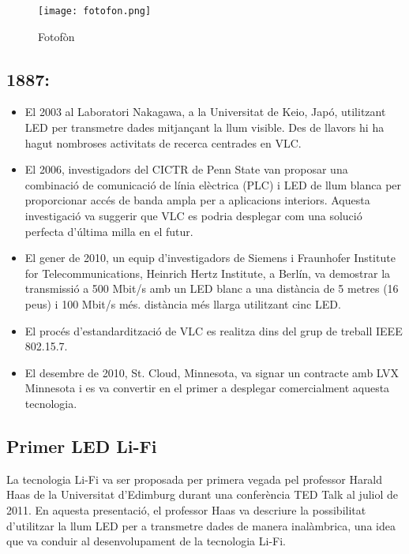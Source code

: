 \begin{figure}[h!]
    \centering
    \texttt{[image: fotofon.png]}
    \caption{Fotofòn}
\end{figure}


\subsection*{1887: }

\begin{itemize}
    \item El 2003 al Laboratori Nakagawa, a la Universitat de Keio, Japó, utilitzant LED per transmetre dades mitjançant la llum visible. Des de llavors hi ha hagut nombroses activitats de recerca centrades en VLC.
    \item El 2006, investigadors del CICTR de Penn State van proposar una combinació de comunicació de línia elèctrica (PLC) i LED de llum blanca per proporcionar accés de banda ampla per a aplicacions interiors. Aquesta investigació va suggerir que VLC es podria desplegar com una solució perfecta d'última milla en el futur.
    \item El gener de 2010, un equip d'investigadors de Siemens i Fraunhofer Institute for Telecommunications, Heinrich Hertz Institute, a Berlín, va demostrar la transmissió a 500 Mbit/s amb un LED blanc a una distància de 5 metres (16 peus) i 100 Mbit/s més. distància més llarga utilitzant cinc LED.
    \item El procés d'estandardització de VLC es realitza dins del grup de treball IEEE 802.15.7.
    \item El desembre de 2010, St. Cloud, Minnesota, va signar un contracte amb LVX Minnesota i es va convertir en el primer a desplegar comercialment aquesta tecnologia.

\end{itemize}


\subsection*{Primer LED Li-Fi}

La tecnologia Li-Fi va ser proposada per primera vegada pel professor Harald Haas de la Universitat d'Edimburg durant una conferència TED Talk al juliol de 2011. En aquesta presentació, el professor Haas va descriure la possibilitat d'utilitzar la llum LED per a transmetre dades de manera inalàmbrica, una idea que va conduir al desenvolupament de la tecnologia Li-Fi.


